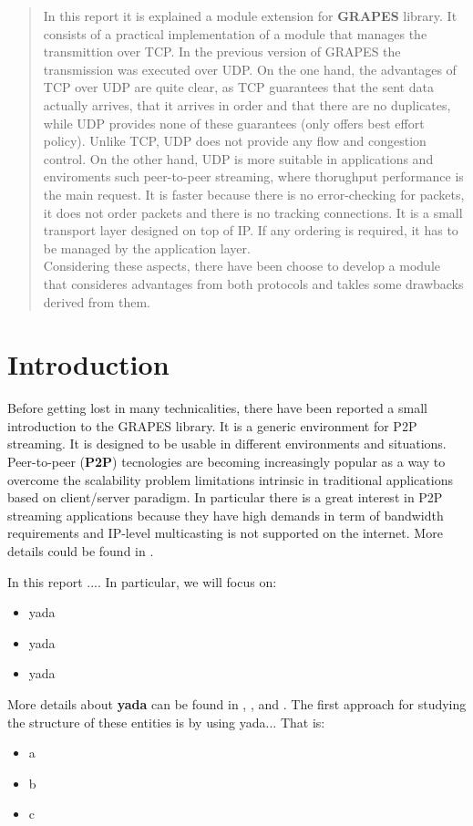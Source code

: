 \documentclass[12pt,a4paper]{report}
\begin{document}


\begin{abstract}
In this report it is explained a module extension for \textbf{GRAPES} library.
It consists of a practical implementation of a module that manages the
transmittion over TCP. In the previous version of GRAPES the transmission was
executed over UDP. On the one hand, the advantages of TCP over UDP are quite
clear, as TCP guarantees that the sent data actually arrives, that it arrives
in order and that there are no duplicates, while UDP provides none of these
guarantees (only offers best effort policy). Unlike TCP, UDP does not provide
any flow and congestion control. On the other hand, UDP is more suitable in
applications and enviroments such peer-to-peer streaming, where thorughput
performance is the main request. It is faster because there is no
error-checking for packets, it does not order packets and there is no
tracking connections. It is a small transport layer designed on top of IP.
If any ordering is required, it has to be managed by the application layer.\\
Considering these aspects, there have been choose to develop a module that
consideres advantages from both protocols and takles some drawbacks derived
from them.

\end{abstract}

\tableofcontents

\chapter{Introduction}
\label{ch:intro}
Before getting lost in many technicalities, there have been reported a small
introduction to the GRAPES library. It is a generic environment for P2P
streaming. It is designed to be usable in different environments and
situations. Peer-to-peer (\textbf{P2P}) tecnologies are becoming increasingly
popular as a way to overcome the scalability problem limitations intrinsic in
traditional applications based on client/server paradigm. In particular there
is a great interest in P2P streaming applications because they have high
demands in term of bandwidth requirements and IP-level multicasting is not
supported on the internet.
More details could be found in \cite{disi10-038}.

In this report ....
In particular, we will focus on:
\begin{itemize}
  \item yada
  \item yada
  \item yada
\end{itemize}
More details about \textbf{yada} can be found in \cite{yada1}, \cite{yada2}, \cite{yada3} and
\cite{yada4}.
The first approach for studying the structure of these entities is by using yada...
That is:
\begin{itemize}
\item a
\item b
\item c
\end{itemize}
\end{document}
